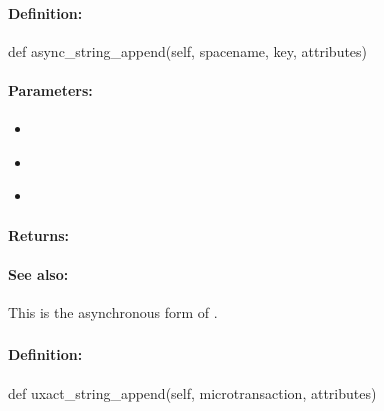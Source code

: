 \paragraph{Definition:}
\begin{pythoncode}
def async_string_append(self, spacename, key, attributes)
\end{pythoncode}

\paragraph{Parameters:}
\begin{itemize}[noitemsep]
\item {}\\

\item {}\\

\item {}\\

\end{itemize}

\paragraph{Returns:}


\paragraph{See also:}  This is the asynchronous form of .

\pagebreak
\subsubsection{}
\label{api:python:uxact_string_append}


\paragraph{Definition:}
\begin{pythoncode}
def uxact_string_append(self, microtransaction, attributes)
\end{pythoncode}


